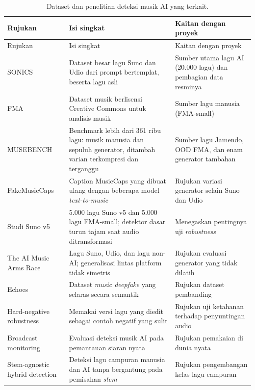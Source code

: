 {\singlespacing\small
\begin{longtable}{L{3.0cm} L{5.4cm} L{3.9cm}}
\caption{Dataset dan penelitian deteksi musik AI yang terkait.}\label{tab:terkait}\\
\toprule
Rujukan & Isi singkat & Kaitan dengan proyek\\
\midrule
\endfirsthead
\toprule
Rujukan & Isi singkat & Kaitan dengan proyek\\
\midrule
\endhead
\bottomrule
\endfoot
SONICS \cite{rahman2025sonics} & Dataset besar lagu Suno dan Udio dari prompt bertemplat, beserta lagu asli & Sumber utama lagu AI (20.000 lagu) dan pembagian data resminya\\
FMA \cite{defferrard2017fma} & Dataset musik berlisensi Creative Commons untuk analisis musik & Sumber lagu manusia (FMA-small)\\
MUSEBENCH \cite{musebench} & Benchmark lebih dari 361 ribu lagu: musik manusia dan sepuluh generator, ditambah varian terkompresi dan terganggu & Sumber lagu Jamendo, OOD FMA, dan enam generator tambahan\\
FakeMusicCaps \cite{comanducci2024fakemusiccaps} & Caption MusicCaps yang dibuat ulang dengan beberapa model \textit{text-to-music} & Rujukan variasi generator selain Suno dan Udio\\
Studi Suno v5 \cite{suno5robust} & 5.000 lagu Suno v5 dan 5.000 lagu FMA-small; detektor dasar turun tajam saat audio ditransformasi & Menegaskan pentingnya uji \textit{robustness}\\
The AI Music Arms Race \cite{crosvila2025armsrace} & Lagu Suno, Udio, dan lagu non-AI; generalisasi lintas platform tidak simetris & Rujukan evaluasi generator yang tidak dilatih\\
Echoes \cite{echoes2026} & Dataset \textit{music deepfake} yang selaras secara semantik & Rujukan dataset pembanding\\
Hard-negative robustness \cite{hardnegative2026} & Memakai versi lagu yang diedit sebagai contoh negatif yang sulit & Rujukan uji ketahanan terhadap penyuntingan audio\\
Broadcast monitoring \cite{broadcast2026} & Evaluasi deteksi musik AI pada pemantauan siaran nyata & Rujukan pemakaian di dunia nyata\\
Stem-agnostic hybrid detection \cite{stemagnostic2026} & Deteksi lagu campuran manusia dan AI tanpa bergantung pada pemisahan \textit{stem} & Rujukan pengembangan kelas lagu campuran\\
\end{longtable}}
